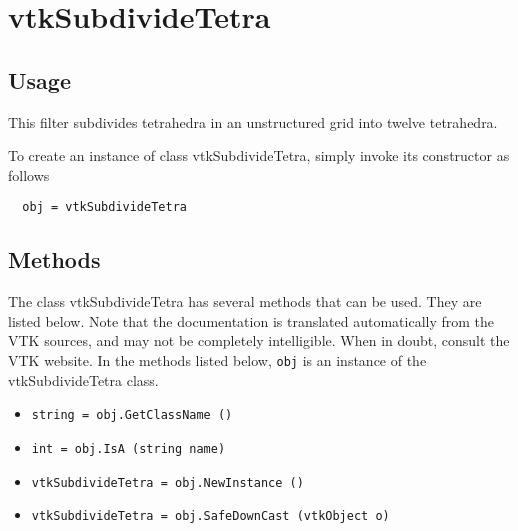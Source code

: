 \section{vtkSubdivideTetra}

\subsection{Usage}

 This filter subdivides tetrahedra in an unstructured grid into twelve tetrahedra.

To create an instance of class vtkSubdivideTetra, simply
invoke its constructor as follows
\begin{verbatim}
  obj = vtkSubdivideTetra
\end{verbatim}
\subsection{Methods}

The class vtkSubdivideTetra has several methods that can be used.
  They are listed below.
Note that the documentation is translated automatically from the VTK sources,
and may not be completely intelligible.  When in doubt, consult the VTK website.
In the methods listed below, \verb|obj| is an instance of the vtkSubdivideTetra class.
\begin{itemize}
\item  \verb|string = obj.GetClassName ()|

\item  \verb|int = obj.IsA (string name)|

\item  \verb|vtkSubdivideTetra = obj.NewInstance ()|

\item  \verb|vtkSubdivideTetra = obj.SafeDownCast (vtkObject o)|

\end{itemize}
